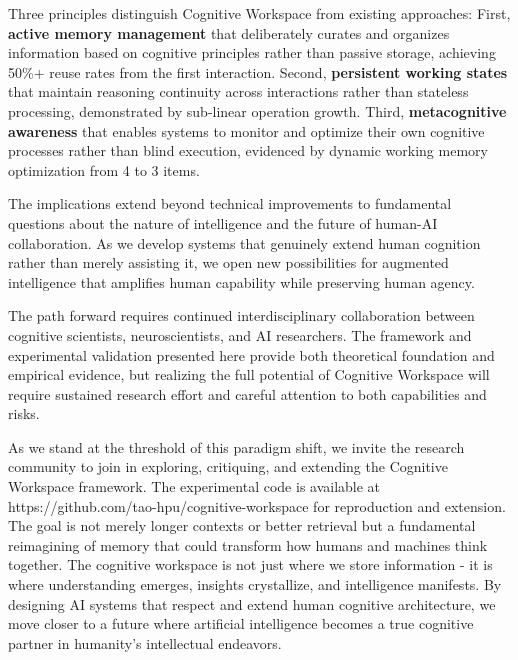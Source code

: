 \documentclass[10pt,twocolumn]{article}
\begin{document}
Three principles distinguish Cognitive Workspace from existing approaches: First, \textbf{active memory management} that deliberately curates and organizes information based on cognitive principles rather than passive storage, achieving 50\%+ reuse rates from the first interaction. Second, \textbf{persistent working states} that maintain reasoning continuity across interactions rather than stateless processing, demonstrated by sub-linear operation growth. Third, \textbf{metacognitive awareness} that enables systems to monitor and optimize their own cognitive processes rather than blind execution, evidenced by dynamic working memory optimization from 4 to 3 items.

The implications extend beyond technical improvements to fundamental questions about the nature of intelligence and the future of human-AI collaboration. As we develop systems that genuinely extend human cognition rather than merely assisting it, we open new possibilities for augmented intelligence that amplifies human capability while preserving human agency.

The path forward requires continued interdisciplinary collaboration between cognitive scientists, neuroscientists, and AI researchers. The framework and experimental validation presented here provide both theoretical foundation and empirical evidence, but realizing the full potential of Cognitive Workspace will require sustained research effort and careful attention to both capabilities and risks.

As we stand at the threshold of this paradigm shift, we invite the research community to join in exploring, critiquing, and extending the Cognitive Workspace framework. The experimental code is available at https://github.com/tao-hpu/cognitive-workspace for reproduction and extension. The goal is not merely longer contexts or better retrieval but a fundamental reimagining of memory that could transform how humans and machines think together. The cognitive workspace is not just where we store information - it is where understanding emerges, insights crystallize, and intelligence manifests. By designing AI systems that respect and extend human cognitive architecture, we move closer to a future where artificial intelligence becomes a true cognitive partner in humanity's intellectual endeavors.



\end{document}
